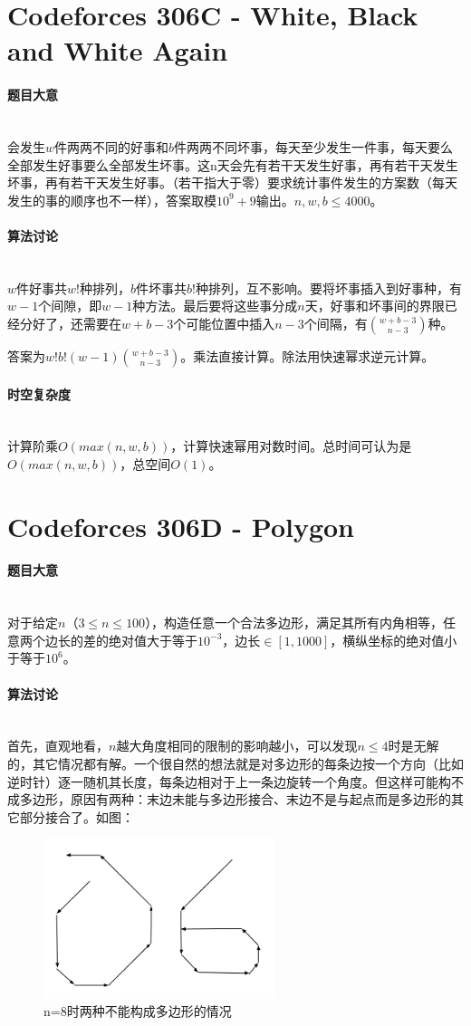 \documentclass[UTF8]{ctexart}
\newcommand{\myparagraph}[1]{\paragraph{#1}\mbox{}\\}
\theoremstyle{nonumberplain}
\begin{document}
	\section{Codeforces 306C - White, Black and White Again}
	
		\myparagraph{题目大意}
			
			会发生$w$件两两不同的好事和$b$件两两不同坏事，每天至少发生一件事，每天要么全部发生好事要么全部发生坏事。这n天会先有若干天发生好事，再有若干天发生坏事，再有若干天发生好事。（若干指大于零）要求统计事件发生的方案数（每天发生的事的顺序也不一样），答案取模$10^9+9$输出。$n,w,b \leq 4000$。
			
		\myparagraph{算法讨论}
		
			$w$件好事共$w!$种排列，$b$件坏事共$b!$种排列，互不影响。要将坏事插入到好事种，有$w-1$个间隙，即$w-1$种方法。最后要将这些事分成$n$天，好事和坏事间的界限已经分好了，还需要在$w+b-3$个可能位置中插入$n-3$个间隔，有$\binom{w+b-3}{n-3}$种。
			
			答案为$w!b!(w-1)\binom{w+b-3}{n-3}$。乘法直接计算。除法用快速幂求逆元计算。
		
		\myparagraph{时空复杂度}
		
			计算阶乘$O(max(n,w,b))$，计算快速幂用对数时间。总时间可认为是$O(max(n,w,b))$，总空间$O(1)$。
	
	\section{Codeforces 306D - Polygon}
	
		\myparagraph{题目大意}
		
			对于给定$n$（$3 \leq n \leq 100$），构造任意一个合法多边形，满足其所有内角相等，任意两个边长的差的绝对值大于等于$10^{-3}$，边长$\in [1,1000]$，横纵坐标的绝对值小于等于$10^6$。
		
		\myparagraph{算法讨论}
		
			首先，直观地看，$n$越大角度相同的限制的影响越小，可以发现$n \leq 4$时是无解的，其它情况都有解。一个很自然的想法就是对多边形的每条边按一个方向（比如逆时针）逐一随机其长度，每条边相对于上一条边旋转一个角度。但这样可能构不成多边形，原因有两种：末边未能与多边形接合、末边不是与起点而是多边形的其它部分接合了。如图：
			
			\begin{figure}[ht]
				\centering
				\includegraphics[width=0.6\textwidth]{fig306d_1.png}
				\caption{n=8时两种不能构成多边形的情况}
			\end{figure}
			
\end{document}

